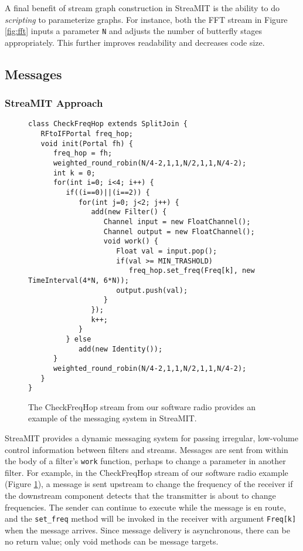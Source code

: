 A final benefit of stream graph construction in StreaMIT is the
ability to do {\it scripting} to parameterize graphs.  For instance,
both the FFT stream in Figure \ref{fig:fft} inputs a parameter {\tt N}
and adjusts the number of butterfly stages appropriately.  This
further improves readability and decreases code size.

\subsection{Messages}

\subsubsection{StreaMIT Approach}

\begin{figure}
\scriptsize
\begin{verbatim}
class CheckFreqHop extends SplitJoin {
   RFtoIFPortal freq_hop;
   void init(Portal fh) {
      freq_hop = fh;
      weighted_round_robin(N/4-2,1,1,N/2,1,1,N/4-2);
      int k = 0;
      for(int i=0; i<4; i++) {
         if((i==0)||(i==2)) {
            for(int j=0; j<2; j++) {
               add(new Filter() {
                  Channel input = new FloatChannel();
                  Channel output = new FloatChannel();
                  void work() {
                     Float val = input.pop();
                     if(val >= MIN_TRASHOLD) 
                        freq_hop.set_freq(Freq[k], new TimeInterval(4*N, 6*N)); 
                     output.push(val);
                  }
               });
               k++;
            }
         } else
            add(new Identity());
      }
      weighted_round_robin(N/4-2,1,1,N/2,1,1,N/4-2);
   }
}
\end{verbatim}
\vspace{-12pt}
\caption{\protect\small The CheckFreqHop stream from our software
   radio provides an example of the messaging system in StreaMIT.
\protect\label{fig:mess}}
\vspace{-12pt}
\end{figure}

StreaMIT provides a dynamic messaging system for passing irregular,
low-volume control information between filters and streams.  Messages
are sent from within the body of a filter's {\tt work} function,
perhaps to change a parameter in another filter.  For example, in the
CheckFreqHop stream of our software radio example (Figure
\ref{fig:mess}), a message is sent upstream to change the frequency of
the receiver if the downstream component detects that the transmitter
is about to change frequencies.  The sender can continue to execute
while the message is en route, and the {\tt set\_freq} method will be
invoked in the receiver with argument {\tt Freq[k]} when the message
arrives.  Since message delivery is asynchronous, there can be no
return value; only void methods can be message targets.

